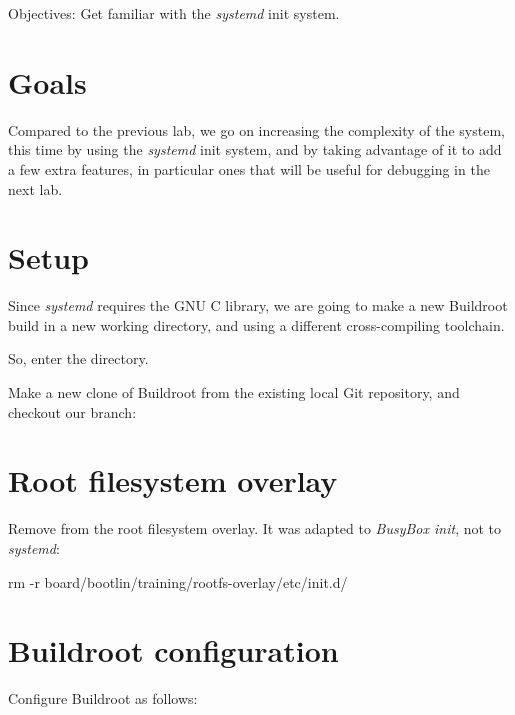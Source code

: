   {Objectives: Get familiar with the {\em systemd} init system.}

\section{Goals}

Compared to the previous lab, we go on increasing the complexity
of the system, this time by using the {\em systemd} init system,
and by taking advantage of it to add a few extra features, in particular
ones that will be useful for debugging in the next lab.

\section{Setup}

Since {\em systemd} requires the GNU C library, we are going
to make a new Buildroot build in a new working directory, and
using a different cross-compiling toolchain.

So, enter the  directory.

Make a new clone of Buildroot from the existing local Git repository,
and checkout our  branch:


\section{Root filesystem overlay}

Remove  from the root filesystem overlay.
It was adapted to {\em BusyBox init}, not to {\em systemd}:

\begin{bashinput}
rm -r board/bootlin/training/rootfs-overlay/etc/init.d/
\end{bashinput}

\section{Buildroot configuration}

Configure Buildroot as follows:

